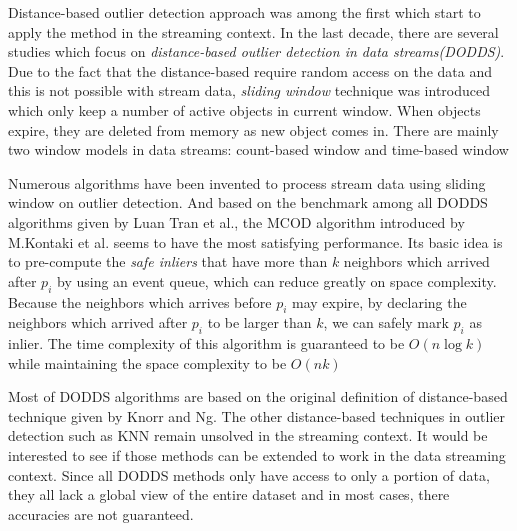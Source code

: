 \documentclass[11pt]{article}       %
\begin{document}
Distance-based outlier detection approach was among the first which start to apply the method in the streaming context. In the last decade, there are several studies which focus on \textit{distance-based outlier detection in data streams(DODDS)}. Due to the fact that the distance-based require random access on the data and this is not possible with stream data, \textit{sliding window} technique was introduced which only keep a number of active objects in current window. When objects expire, they are deleted from memory as new object comes in. There are mainly two window models in data streams: count-based window and time-based window

Numerous algorithms have been invented to process stream data using sliding window on outlier detection. And based on the benchmark among all DODDS algorithms given by Luan Tran et al.\cite{Tran:2016:DOD:2994509.2994526}, the MCOD algorithm introduced by M.Kontaki et al.\cite{5767923} seems to have the most satisfying performance. Its basic idea is to pre-compute the \textit{safe inliers} that have more than $k$ neighbors which arrived after $p_{i}$ by using an event queue, which can reduce greatly on space complexity. Because the neighbors which arrives before $p_{i}$ may expire, by declaring the neighbors which arrived after $p_{i}$ to be larger than $k$, we can safely mark $p_{i}$ as inlier. The time complexity of this algorithm is guaranteed to be $O(n\log{k})$ while maintaining the space complexity to be $O(nk)$

Most of DODDS algorithms are based on the original definition of distance-based technique given by Knorr and Ng\cite{EKnorr:1998}. The other distance-based techniques in outlier detection such as KNN remain unsolved in the streaming context. It would be interested to see if those methods can be extended to work in the data streaming context. Since all DODDS methods only have access to only a portion of data, they all lack a global view of the entire dataset and in most cases, there accuracies are not guaranteed. 
\end{document}
